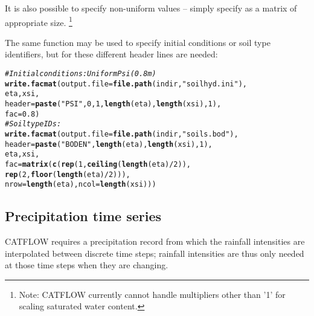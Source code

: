 \documentclass[article,nojss]{jss}\usepackage[]{graphicx}\usepackage[]{xcolor}
\makeatletter
\newcommand{\hlnum}[1]{\textcolor[rgb]{0.686,0.059,0.569}{#1}}%
\newcommand{\hlsng}[1]{\textcolor[rgb]{0.192,0.494,0.8}{#1}}%
\newcommand{\hlcom}[1]{\textcolor[rgb]{0.678,0.584,0.686}{\textit{#1}}}%
\newcommand{\hlopt}[1]{\textcolor[rgb]{0,0,0}{#1}}%
\newcommand{\hldef}[1]{\textcolor[rgb]{0.345,0.345,0.345}{#1}}%
\newcommand{\hlkwc}[1]{\textcolor[rgb]{0.333,0.667,0.333}{#1}}%
\newcommand{\hlkwd}[1]{\textcolor[rgb]{0.737,0.353,0.396}{\textbf{#1}}}%
\newenvironment{kframe}{%
 \def\at@end@of@kframe{}%
 \ifinner\ifhmode%
  \def\at@end@of@kframe{\end{minipage}}%
  \begin{minipage}{\columnwidth}%
 \fi\fi%
 \def\FrameCommand##1{\hskip\@totalleftmargin \hskip-\fboxsep
 \colorbox{shadecolor}{##1}\hskip-\fboxsep
     \hskip-\linewidth \hskip-\@totalleftmargin \hskip\columnwidth}%
 \MakeFramed {\advance\hsize-\width
   \@totalleftmargin\z@ \linewidth\hsize
   \@setminipage}}%
 {\par\unskip\endMakeFramed%
 \at@end@of@kframe}
\newenvironment{knitrout}{}{} %
\makeatother
\begin{document}
It is also possible to specify non-uniform values -- simply specify  as a matrix of appropriate size.  \footnote{Note: CATFLOW currently cannot handle multipliers other than '1' for scaling saturated water content.}


The same function may be used to specify initial conditions or soil type identifiers, but for these different header lines are needed:
\begin{knitrout}
\color{fgcolor}\begin{kframe}
\begin{alltt}
\hlcom{# Initial conditions: Uniform Psi (0.8 m) }
  \hlkwd{write.facmat}\hldef{(}\hlkwc{output.file}\hldef{=}\hlkwd{file.path}\hldef{(indir,} \hlsng{"soilhyd.ini"}\hldef{),}
               \hldef{eta, xsi,}
               \hlkwc{header}\hldef{=}\hlkwd{paste}\hldef{(}\hlsng{"PSI   "}\hldef{,} \hlnum{0}\hldef{,}  \hlnum{1}\hldef{,} \hlkwd{length}\hldef{(eta),} \hlkwd{length}\hldef{(xsi),} \hlnum{1}\hldef{),}
               \hlkwc{fac} \hldef{=} \hlnum{0.8}\hldef{)}
\hlcom{# Soil type IDs: }
   \hlkwd{write.facmat}\hldef{(}\hlkwc{output.file}\hldef{=}\hlkwd{file.path}\hldef{(indir,} \hlsng{"soils.bod"}\hldef{),}
               \hlkwc{header}\hldef{=} \hlkwd{paste}\hldef{(}\hlsng{"BODEN"}\hldef{,}  \hlkwd{length}\hldef{(eta),} \hlkwd{length}\hldef{(xsi),} \hlnum{1}\hldef{),}
               \hldef{eta, xsi,}
               \hlkwc{fac} \hldef{=} \hlkwd{matrix}\hldef{(}\hlkwd{c}\hldef{(}\hlkwd{rep}\hldef{(}\hlnum{1}\hldef{,} \hlkwd{ceiling}\hldef{(}\hlkwd{length}\hldef{(eta)}\hlopt{/}\hlnum{2}\hldef{)),}
                              \hlkwd{rep}\hldef{(}\hlnum{2}\hldef{,}\hlkwd{floor}\hldef{(}\hlkwd{length}\hldef{(eta)}\hlopt{/}\hlnum{2}\hldef{)) ),}
               \hlkwc{nrow} \hldef{=} \hlkwd{length}\hldef{(eta),} \hlkwc{ncol} \hldef{=} \hlkwd{length}\hldef{(xsi))  )}
\end{alltt}
\end{kframe}
\end{knitrout}



\subsection{Precipitation time series} \label{sec:rain}

CATFLOW requires a precipitation record from which the rainfall intensities 
are interpolated between discrete time steps; rainfall intensities are thus only needed  
at those time steps when they are changing. 
\end{document}
